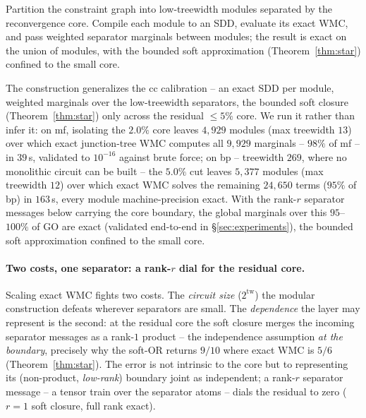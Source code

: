 \documentclass[anon]{nesy2026}
\newcommand{\tw}{\ensuremath{\mathrm{tw}}}
\begin{document}
\begin{proposition}\label{prop:modular}
Partition the constraint graph into low-treewidth modules separated by the reconvergence core. Compile each module to an SDD, evaluate its exact WMC, and pass weighted separator marginals between modules; the result is exact on the union of modules, with the bounded soft approximation (Theorem~\ref{thm:star}) confined to the small core.
\end{proposition}

The construction generalizes the cc calibration -- an exact SDD per module, weighted marginals over the low-treewidth separators, the bounded soft closure (Theorem~\ref{thm:star}) only across the residual ${\le}5\%$ core. We run it rather than infer it: on mf, isolating the $2.0\%$ core leaves $4{,}929$ modules (max treewidth $13$) over which exact junction-tree WMC computes all $9{,}929$ marginals -- $98\%$ of mf -- in $39$\,s, validated to $10^{-16}$ against brute force; on bp -- treewidth $269$, where no monolithic circuit can be built -- the $5.0\%$ cut leaves $5{,}377$ modules (max treewidth $12$) over which exact WMC solves the remaining $24{,}650$ terms ($95\%$ of bp) in $163$\,s, every module machine-precision exact. With the rank-$r$ separator messages below carrying the core boundary, the global marginals over this $95$--$100\%$ of GO are exact (validated end-to-end in \S\ref{sec:experiments}), the bounded soft approximation confined to the small core.

\paragraph{Two costs, one separator: a rank-$r$ dial for the residual core.}
Scaling exact WMC fights two costs. The \emph{circuit size} ($2^{\tw}$) the modular construction defeats wherever separators are small. The \emph{dependence} the layer may represent is the second: at the residual core the soft closure merges the incoming separator messages as a rank-$1$ product -- the independence assumption \emph{at the boundary}, precisely why the soft-OR returns $9/10$ where exact WMC is $5/6$ (Theorem~\ref{thm:star}). The error is not intrinsic to the core but to representing its (non-product, \emph{low-rank}) boundary joint as independent; a rank-$r$ separator message -- a tensor train over the separator atoms -- dials the residual to zero ($r{=}1$ soft closure, full rank exact).
\end{document}
